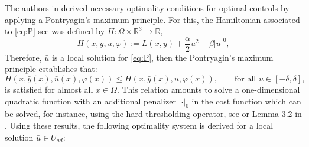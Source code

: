 \documentclass[11pt,a4paper]{amsart}
\newcommand{\om}{\Omega}
\begin{document}
The authors in \cite{itokun2014} derived necessary optimality conditions for optimal controls by applying a Pontryagin's maximum principle. For this, the Hamiltonian associated to \eqref{eq:P} see \cite{itokun2014,wachsmuth19,caswach20} was defined by $H:\om\times\mathbb{R}^3\to\mathbb{R}$, 
\[
H(x,y,u,\varphi):=L(x,y)+\frac{\alpha}{2}u^2+\beta|u|^0,
\]
Therefore,  $\bar u$ is a local solution for \eqref{eq:P}, then the Pontryagin's maximum principle establishes that:
\[
H(x,\bar y(x), \bar u(x), \varphi(x))\le H(x,\bar y(x), u, \varphi(x)), \qquad \text{for all }u\in [-\delta,\delta],
\]
is satisfied for almost all $x\in\om$. This relation amounts to solve a one-dimensional quadratic function with an additional penalizer $|\cdot|_0$ in the cost function which can be solved, for instance, using the hard-thresholding operator, see \cite{itokun04} or Lemma 3.2 in \cite{caswach20}. Using these results, the following optimality system is derived for a local solution $\bar u \in U_{ad}$:
\end{document}
